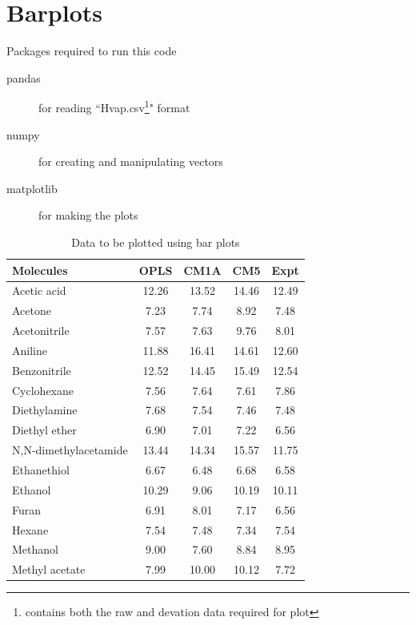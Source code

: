 \documentclass[11pt,fleqn]{book} %
\begin{document}
\chapter{Barplots}
Packages required to run this code
\begin{description}
  \item[pandas] for reading ``Hvap.csv\footnote{contains both the raw and devation data required for plot}" format
  \item[numpy] for creating and manipulating vectors
  \item[matplotlib] for making the plots
\end{description}
\begin{table}
\caption{Data to be plotted using bar plots}
\begin{tabular}{lcccc}
\toprule
             Molecules &  OPLS &  CM1A &  CM5 &  Expt \\
\midrule
          Acetic acid &      12.26 &      13.52 &     14.46 &      12.49 \\
              Acetone &       7.23 &       7.74 &      8.92 &       7.48 \\
         Acetonitrile &       7.57 &       7.63 &      9.76 &       8.01 \\
              Aniline &      11.88 &      16.41 &     14.61 &      12.60 \\
         Benzonitrile &      12.52 &      14.45 &     15.49 &      12.54 \\
          Cyclohexane &       7.56 &       7.64 &      7.61 &       7.86 \\
         Diethylamine &       7.68 &       7.54 &      7.46 &       7.48 \\
        Diethyl ether &       6.90 &       7.01 &      7.22 &       6.56 \\
N,N-dimethylacetamide &      13.44 &      14.34 &     15.57 &      11.75 \\
          Ethanethiol &       6.67 &       6.48 &      6.68 &       6.58 \\
              Ethanol &      10.29 &       9.06 &     10.19 &      10.11 \\
                Furan &       6.91 &       8.01 &      7.17 &       6.56 \\
               Hexane &       7.54 &       7.48 &      7.34 &       7.54 \\
             Methanol &       9.00 &       7.60 &      8.84 &       8.95 \\
       Methyl acetate &       7.99 &      10.00 &     10.12 &       7.72 \\

\end{tabular}
\end{table}
\end{document}
